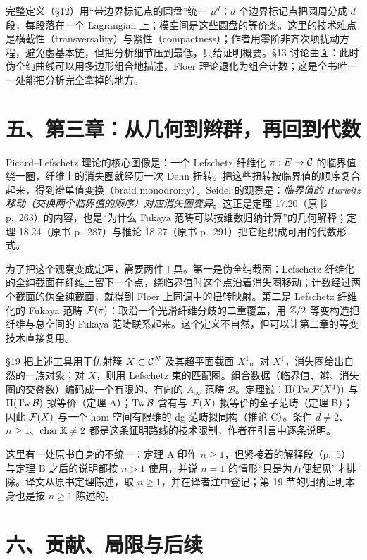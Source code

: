 完整定义（§12）用“带边界标记点的圆盘”统一 $\mu^d$：$d$ 个边界标记点把圆周分成 $d$ 段，每段落在一个 Lagrangian 上；模空间是这些圆盘的等价类。这里的技术难点是横截性（transversality）与紧性（compactness）；作者用零阶非齐次项扰动方程，避免虚基本链，但把分析细节压到最低，只给证明概要。§13 讨论曲面：此时伪全纯曲线可以用多边形组合地描述，Floer 理论退化为组合计数；这是全书唯一一处能把分析完全拿掉的地方。

\section*{五、第三章：从几何到辫群，再回到代数}

Picard--Lefschetz 理论的核心图像是：一个 Lefschetz 纤维化 $\pi:E\to\mathcal C$ 的临界值绕一圈，纤维上的消失圈就经历一次 Dehn 扭转。把这些扭转按临界值的顺序复合起来，得到辫单值变换（braid monodromy）。Seidel 的观察是：\emph{临界值的 Hurwitz 移动（交换两个临界值的顺序）对应消失圈变异}。这正是定理 17.20（原书 p.~263）的内容，也是“为什么 Fukaya 范畴可以按维数归纳计算”的几何解释；定理 18.24（原书 p.~287）与推论 18.27（原书 p.~291）把它组织成可用的代数形式。

为了把这个观察变成定理，需要两件工具。第一是伪全纯截面：Lefschetz 纤维化的全纯截面在纤维上留下一个点，绕临界值时这个点沿着消失圈移动；计数经过两个截面的伪全纯截面，就得到 Floer 上同调中的扭转映射。第二是 Lefschetz 纤维化的 Fukaya 范畴 $\mathcal F(\pi)$：取沿一个光滑纤维分歧的二重覆盖，用 $\mathbb Z/2$ 等变构造把纤维与总空间的 Fukaya 范畴联系起来。这个定义不自然，但可以让第二章的等变技术直接复用。

§19 把上述工具用于仿射簇 $X\subset\mathcal C^N$ 及其超平面截面 $X^1$。对 $X^1$，消失圈给出自然的一族对象；对 $X$，则用 Lefschetz 束的匹配圈。组合数据（临界值、辫、消失圈的交叠数）编码成一个有限的、有向的 $A_\infty$ 范畴 $\mathcal B$。定理说：$\Pi(\operatorname{Tw}\mathcal F(X^1))$ 与 $\Pi(\operatorname{Tw}\mathcal B)$ 拟等价（定理 A）；$\operatorname{Tw}\mathcal B$ 含有与 $\mathcal F(X)$ 拟等价的全子范畴（定理 B）；因此 $\mathcal F(X)$ 与一个 hom 空间有限维的 dg 范畴拟同构（推论 C）。条件 $d\ne2$、$n\ge1$、$\operatorname{char}\mathbb K\ne2$ 都是这条证明路线的技术限制，作者在引言中逐条说明。

这里有一处原书自身的不统一：定理 A 印作 $n\ge1$，但紧接着的解释段（p.~5）与定理 B 之后的说明都按 $n>1$ 使用，并说 $n=1$ 的情形“只是为方便起见”才排除。译文从原书定理陈述，取 $n\ge1$，并在译者注中登记；第 19 节的归纳证明本身也是按 $n\ge1$ 陈述的。

\section*{六、贡献、局限与后续}

